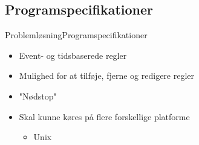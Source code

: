 \subsection{Programspecifikationer}
\begin{frame}{Problemløsning}{Programspecifikationer}
\begin{itemize}
	\item Event- og tidsbaserede regler
	\item Mulighed for at tilføje, fjerne og redigere regler
	\item "Nødstop"
	\item Skal kunne køres på flere forskellige platforme
	\begin{itemize}
		\item Unix
	\end{itemize}
\end{itemize}
\end{frame}